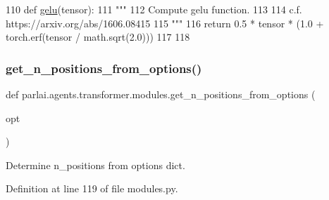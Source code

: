 \begin{DoxyCode}
110 \textcolor{keyword}{def }\hyperlink{namespaceparlai_1_1agents_1_1transformer_1_1modules_ad93916b8d2188c35733089e1581c44f8}{gelu}(tensor):
111     \textcolor{stringliteral}{"""}
112 \textcolor{stringliteral}{    Compute gelu function.}
113 \textcolor{stringliteral}{}
114 \textcolor{stringliteral}{    c.f. https://arxiv.org/abs/1606.08415}
115 \textcolor{stringliteral}{    """}
116     \textcolor{keywordflow}{return} 0.5 * tensor * (1.0 + torch.erf(tensor / math.sqrt(2.0)))
117 
118 
\end{DoxyCode}
\mbox{\label{namespaceparlai_1_1agents_1_1transformer_1_1modules_ab67607512c597ddd54f2b60a1a1eaf4c}} 
\subsubsection{\texorpdfstring{get\+\_\+n\+\_\+positions\+\_\+from\+\_\+options()}{get\_n\_positions\_from\_options()}}
{\footnotesize\ttfamily def parlai.\+agents.\+transformer.\+modules.\+get\+\_\+n\+\_\+positions\+\_\+from\+\_\+options (\begin{DoxyParamCaption}\item[{}]{opt }\end{DoxyParamCaption})}

\begin{DoxyVerb}Determine n_positions from options dict.
\end{DoxyVerb}
 

Definition at line 119 of file modules.\+py.


